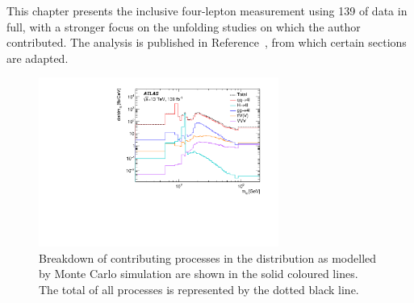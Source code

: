 This chapter presents the inclusive four-lepton measurement using \unit{139}{\invfb} of data in full, with a stronger focus on the unfolding studies on which the author contributed. The analysis is published in Reference~\cite{m4l2021_paper}, from which certain sections are adapted.

\begin{figure}
    \centering
    \includegraphics[width=0.7\textwidth]{Figures/m4l/processbreakdown.pdf}
    \caption{Breakdown of contributing processes in the \mFourL{} distribution as modelled by Monte Carlo simulation are shown in the solid coloured lines. The total of all processes is represented by the dotted black line.}
    \label{fig:m4lbreakdown}
\end{figure}

